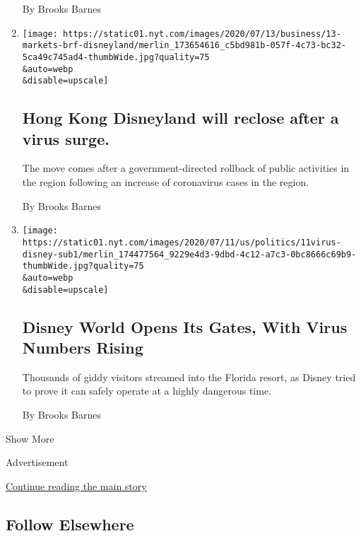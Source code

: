 \begin{enumerate}
  By Brooks Barnes
\item
  \href{/live/2020/07/13/business/stock-market-today-coronavirus/hong-kong-disneyland-will-reclose-after-a-virus-surge}{}

  \texttt{[image: https://static01.nyt.com/images/2020/07/13/business/13-markets-brf-disneyland/merlin\_173654616\_c5bd981b-057f-4c73-bc32-5ca49c745ad4-thumbWide.jpg?quality=75\\\&auto=webp\\\&disable=upscale]}

  \hypertarget{hong-kong-disneyland-will-reclose-after-a-virus-surge}{%
  \subsection{Hong Kong Disneyland will reclose after a virus
  surge.}\label{hong-kong-disneyland-will-reclose-after-a-virus-surge}}

  The move comes after a government-directed rollback of public
  activities in the region following an increase of coronavirus cases in
  the region.

  By Brooks Barnes
\item
  \href{/2020/07/11/business/florida-coronavirus-disney-world-reopening.html}{}

  \texttt{[image: https://static01.nyt.com/images/2020/07/11/us/politics/11virus-disney-sub1/merlin\_174477564\_9229e4d3-9dbd-4c12-a7c3-0bc8666c69b9-thumbWide.jpg?quality=75\\\&auto=webp\\\&disable=upscale]}

  \hypertarget{disney-world-opens-its-gates-with-virus-numbers-rising}{%
  \subsection{Disney World Opens Its Gates, With Virus Numbers
  Rising}\label{disney-world-opens-its-gates-with-virus-numbers-rising}}

  Thousands of giddy visitors streamed into the Florida resort, as
  Disney tried to prove it can safely operate at a highly dangerous
  time.

  By Brooks Barnes
\end{enumerate}

Show More

Advertisement

\protect\hyperlink{after-mid2}{Continue reading the main story}

\hypertarget{follow-elsewhere}{%
\subsection{Follow Elsewhere}\label{follow-elsewhere}}

